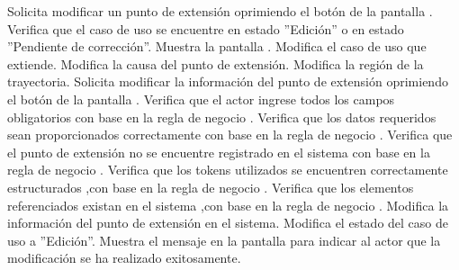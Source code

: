 	\begin{UCtrayectoria}
		\UCpaso[\UCactor] Solicita modificar un punto de extensión oprimiendo el botón \editar de la pantalla .
		\UCpaso[\UCactor] Verifica que el caso de uso se encuentre en estado ''Edición'' o en estado ''Pendiente de corrección''. 
		\UCpaso[\UCsist] Muestra la pantalla .
		\UCpaso[\UCactor] Modifica el caso de uso que extiende. \label{CU12.1.6.2-P4}
		\UCpaso[\UCactor] Modifica la causa del punto de extensión.
		\UCpaso[\UCsist] Modifica la región de la trayectoria.  \label{CU12.1.6.2-P6}
		\UCpaso[\UCactor] Solicita modificar la información del punto de extensión oprimiendo el botón  de la pantalla .  
		\UCpaso[\UCsist] Verifica que el actor ingrese todos los campos obligatorios con base en la regla de negocio . 
		\UCpaso[\UCsist] Verifica que los datos requeridos sean proporcionados correctamente con base en la regla de negocio .   
		\UCpaso[\UCsist] Verifica que el punto de extensión no se encuentre registrado en el sistema con base en la regla de negocio .  
		\UCpaso[\UCsist] Verifica que los tokens utilizados se encuentren correctamente estructurados ,con base en la regla de negocio . 
		\UCpaso[\UCsist] Verifica que los elementos referenciados existan en el sistema ,con base en la regla de negocio . 
		\UCpaso[\UCsist] Modifica la información del punto de extensión en el sistema.
		\UCpaso[\UCsist] Modifica el estado del caso de uso a ''Edición''.
		\UCpaso[\UCsist] Muestra el mensaje  en la pantalla  para indicar al actor que la modificación se ha realizado exitosamente.
	\end{UCtrayectoria}		
	
